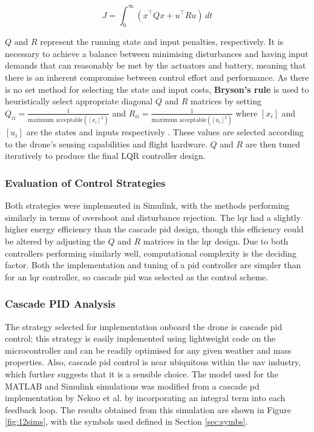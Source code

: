 \begin{equation} \label{eq:cost_function}
J = \int_0^\infty \left( x^\top Q x + u^\top R u \right) \, dt 
\end{equation}

$Q$ and $R$ represent the running state and input penalties, respectively. It is necessary to achieve a balance between minimising disturbances and having input demands that can reasonably be met by the actuators and battery, meaning that there is an inherent compromise between control effort and performance. As there is no set method for selecting the state and input costs, \textbf{Bryson's rule} is used to heuristically select appropriate diagonal $Q$ and $R$ matrices by setting $Q_{ii} = \frac{1}{\text{maximum acceptable}( [x_i]^2 )}$ and $R_{ii} = \frac{1}{\text{maximum acceptable}( [u_i]^2 )}$ where $[x_i]$ and $[u_i]$ are the states and inputs respectively \cite{chibum2014adv09designofsfb1}. These values are selected according to the drone's sensing capabilities and flight hardware. $Q$ and $R$ are then tuned iteratively to produce the final LQR controller design.

\subsubsection{Evaluation of Control Strategies}

Both strategies were implemented in Simulink, with the methods performing similarly in terms of overshoot and disturbance rejection. The \gls{lqr} had a slightly higher energy efficiency than the cascade \gls{pid} design, though this efficiency could be altered by adjusting the $Q$ and $R$ matrices in the \gls{lqr} design. Due to both controllers performing similarly well, computational complexity is the deciding factor. Both the implementation and tuning of a \gls{pid} controller are simpler than for an \gls{lqr} controller, so cascade \gls{pid} was selected as the control scheme.

\subsubsection{Cascade PID Analysis}
\label{sec:cascpid}

The strategy selected for implementation onboard the drone is cascade \gls{pid} control; this strategy is easily implemented using lightweight code on the microcontroller and can be readily optimised for any given weather and mass properties. Also, cascade \gls{pid} control is near ubiquitous within the \gls{uav} industry, which further suggests that it is a sensible choice. The model used for the MATLAB and Simulink simulations was modified from a cascade \gls{pd} implementation by Nekoo et al. \cite{nekoo} by incorporating an integral term into each feedback loop. The results obtained from this simulation are shown in Figure \ref{fig:12sims}, with the symbols used defined in Section \ref{sec:symbs}. 

